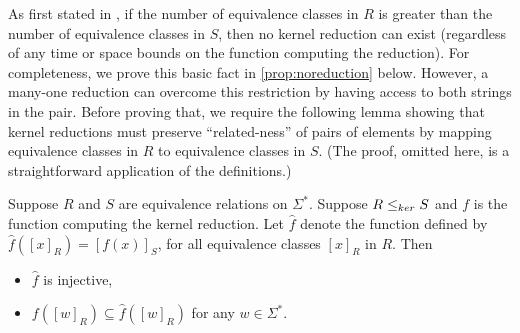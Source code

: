 As first stated in \autocite{fg11}, if the number of equivalence classes in $R$ is greater than the number of equivalence classes in $S$, then no kernel reduction can exist (regardless of any time or space bounds on the function computing the reduction).
For completeness, we prove this basic fact in \autoref{prop:noreduction} below.
However, a many-one reduction can overcome this restriction by having access to both strings in the pair.
Before proving that, we require the following lemma showing that kernel reductions must preserve ``related-ness'' of pairs of elements by mapping equivalence classes in $R$ to equivalence classes in $S$.
(The proof, omitted here, is a straightforward application of the definitions.)

\begin{lemma}\label{lem:image}
  Suppose $R$ and $S$ are equivalence relations on $\Sigma^*$.
  Suppose $R \leq_{ker} S$ and $f$ is the function computing the kernel reduction.
  Let $\hat{f}$ denote the function defined by $\hat{f}([x]_R) = [f(x)]_S$, for all equivalence classes $[x]_R$ in $R$.
  Then
  \begin{itemize}
  \item $\hat{f}$ is injective,
  \item $f([w]_R) \subseteq \hat{f}([w]_R)$ for any $w \in \Sigma^*$.
  \end{itemize}
\end{lemma}


